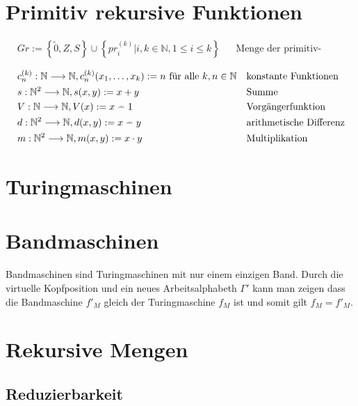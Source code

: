 \documentclass[10pt,oneside,a4paper]{scrartcl}
\newcommand{\dotminus}{\stackrel{\cdot}{\relbar}}
\begin{document}
\section{Primitiv rekursive Funktionen}

    \begin{align}
    &Gr := \left\{\tilde{0}, Z, S\right\} \cup
           \left\{pr_i^{(k)}|i,k\in\mathbb{N}, 1\leq i\leq k\right\}
        && \text{Menge der primitiv-rekursiven Grundfunktionen (PRK)}
    \end{align}

    \begin{align}
    &c_n^{(k)} : \mathbb{N}\longrightarrow \mathbb{N},
        c_n^{(k)}(x_1,\ldots,x_k) := n \text{ für alle }k,n\in\mathbb{N}
        && \text{konstante Funktionen}\\
    &s : \mathbb{N}^2\longrightarrow \mathbb{N}, s(x, y) := x+y
        && \text{Summe}\\
    &V : \mathbb{N}\longrightarrow \mathbb{N}, V(x) := x \dotminus 1
        && \text{Vorgängerfunktion}\\
    &d : \mathbb{N}^2\longrightarrow \mathbb{N}, d(x, y) := x \dotminus y
        && \text{arithmetische Differenz}\\
    &m : \mathbb{N}^2\longrightarrow \mathbb{N}, m(x, y) := x \cdot y
        && \text{Multiplikation}
    \end{align}

\section{Turingmaschinen}

\section{Bandmaschinen}

    Bandmaschinen sind Turingmaschinen mit nur einem einzigen Band. Durch die
    virtuelle Kopfposition und ein neues Arbeitsalphabeth $\Gamma'$ kann man
    zeigen dass die Bandmaschine $f'_M$ gleich der Turingmaschine $f_M$ ist und
    somit gilt $f_M = f'_M$.

\section{Rekursive Mengen}

\subsection{Reduzierbarkeit}
\end{document}
